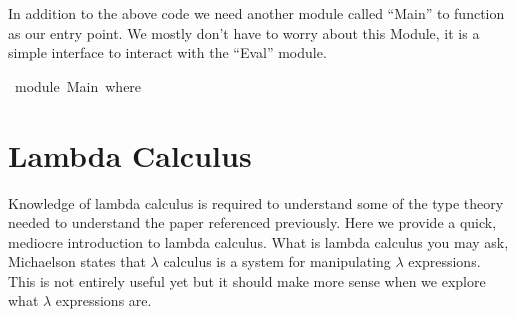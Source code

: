 \documentclass[a4paper,11pt]{article}
\newcommand{\Conid}[1]{\mathit{#1}}
\newcommand{\Varid}[1]{\mathit{#1}}
\def\resethooks{%
  \global\let\SaveRestoreHook\empty
  \global\let\ColumnHook\empty}
\newlength{\blanklineskip}
\let\hspre\empty
\let\hspost\empty
\begin{document}
\resethooks

In addition to the above code we need another module called ``Main'' to function as our entry point. We mostly don't have to worry about this Module, it is a simple interface to 
interact with the ``Eval'' module. 
\begin{tabbing}\ttfamily
~module~Main~where
\end{tabbing}

\section{Lambda Calculus}
Knowledge of lambda calculus is required to understand some of the type theory needed to understand the paper referenced previously. Here we 
provide a quick, mediocre introduction to lambda calculus. What is lambda calculus you may ask, Michaelson states that $\lambda$ calculus is a system for manipulating $\lambda$ expressions.
This is not entirely useful yet but it should make more sense when we explore what $\lambda$ expressions are. 
\end{document}
